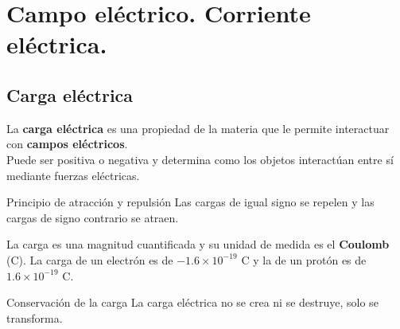 \section{Campo eléctrico. Corriente eléctrica.}
\subsection{Carga eléctrica}
La \textbf{carga eléctrica} es una propiedad de la materia que le permite interactuar con \textbf{campos eléctricos}.\\ Puede ser positiva o negativa y determina como los objetos interactúan entre sí mediante fuerzas eléctricas.

\begin{proposicion}{Principio de atracción y repulsión}
    Las cargas de igual signo se repelen y las cargas de signo contrario se atraen.
\end{proposicion}

La carga es una magnitud cuantificada y su unidad de medida es el \textbf{Coulomb} (C). La carga de un electrón es de $-1.6 \times 10^{-19}$ C y la de un protón es de $1.6 \times 10^{-19}$ C.
\begin{proposicion}{Conservación de la carga}
    La carga eléctrica no se crea ni se destruye, solo se transforma.
\end{proposicion}

    
